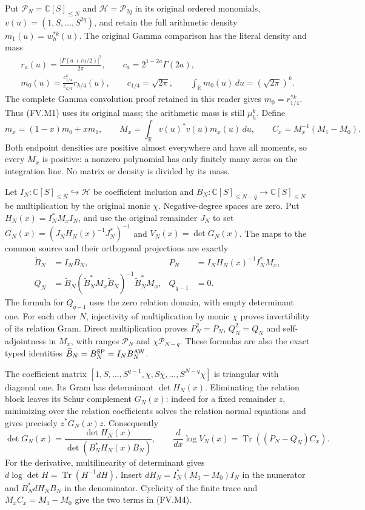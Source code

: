 Put $\mathcal P_N=\mathbb C[S]_{\le N}$ and $\mathcal H=\mathcal P_{2q}$ in its original ordered monomials,
$v(u)=(1,S,\ldots,S^{2q})$, and retain the full arithmetic density
$m_1(u)=w_h^{*k}(u)$. The original Gamma comparison has the literal density
and mass
\[
 \begin{gathered}
 r_a(u)=\frac{|\Gamma(a+iu/2)|^2}{2\pi},\qquad
 c_a=2^{1-2a}\Gamma(2a),\\
 m_0(u)=\frac{c_{1/4}^{k}}{c_{k/4}}r_{k/4}(u),\qquad
 c_{1/4}=\sqrt{2\pi},\qquad
 \int_{\mathbb R}m_0(u)\,du=(\sqrt{2\pi})^k.
 \end{gathered}\tag{FV.M1}\label{fvmetric:density}
\]
The complete Gamma convolution proof retained in this reader gives
$m_0=r_{1/4}^{*k}$. Thus (FV.M1) uses its original mass; the arithmetic
mass is still $\mu_h^k$. Define
\[
 m_x=(1-x)m_0+xm_1,\qquad
 M_x=\int_{\mathbb R}v(u)^*v(u)m_x(u)\,du,
 \qquad C_x=M_x^{-1}(M_1-M_0).
 \tag{FV.M2}\label{fvmetric:path}
\]
Both endpoint densities are positive almost everywhere and have all
moments, so every $M_x$ is positive: a nonzero polynomial has only finitely
many zeros on the integration line. No matrix or density is divided by
its mass.

Let $I_N:\mathbb C[S]_{\le N}\hookrightarrow\mathcal H$ be coefficient
inclusion and $B_N:\mathbb C[S]_{\le N-q}\to\mathbb C[S]_{\le N}$ be
multiplication by the original monic $\chi$. Negative-degree spaces are
zero. Put $H_N(x)=I_N^*M_xI_N$, and use the original remainder $J_N$ to set
$G_N(x)=(J_NH_N(x)^{-1}J_N^*)^{-1}$ and $V_N(x)=\det G_N(x)$.
The maps to the common source and their orthogonal projections are exactly
\[
 \begin{aligned}
 \widetilde B_N&=I_N B_N,&
 P_N&=I_N H_N(x)^{-1}I_N^*M_x,\\
 Q_N&=\widetilde B_N
       (\widetilde B_N^*M_x\widetilde B_N)^{-1}
                          \widetilde B_N^*M_x,& Q_{q-1}&=0.
 \end{aligned}\tag{FV.M3}\label{fvmetric:maps}
\]
The formula for $Q_{q-1}$ uses the zero relation domain, with empty
determinant one. For each other $N$, injectivity of multiplication by
monic $\chi$ proves invertibility of its relation Gram. Direct
multiplication proves $P_N^2=P_N$, $Q_N^2=Q_N$ and self-adjointness in
$M_x$, with ranges $\mathcal P_N$ and $\chi\mathcal P_{N-q}$.
These formulas are also the exact typed identities
$\widetilde B_N=B_N^{\rm SP}=I_N B_N^{\rm AW}$.

The coefficient matrix
$[1,S,\ldots,S^{q-1},\chi,S\chi,\ldots,S^{N-q}\chi]$ is triangular
with diagonal one. Its Gram has determinant $\det H_N(x)$.
Eliminating the relation block leaves its Schur complement $G_N(x)$:
indeed for a fixed remainder $z$, minimizing over the relation
coefficients solves the relation normal equations and gives precisely
$z^*G_N(x)z$. Consequently
\[
 \det G_N(x)=\frac{\det H_N(x)}{\det(B_N^*H_N(x)B_N)},\qquad
 \frac{d}{dx}\log V_N(x)=\operatorname{Tr}((P_N-Q_N)C_x).
 \tag{FV.M4}\label{fvmetric:derivative}
\]
For the derivative, multilinearity of determinant gives
$d\log\det H=\operatorname{Tr}(H^{-1}dH)$.
Insert $dH_N=I_N^*(M_1-M_0)I_N$ in the numerator and
$B_N^*dH_NB_N$ in the denominator. Cyclicity of the finite trace
and $M_xC_x=M_1-M_0$ give the two terms in (FV.M4).

